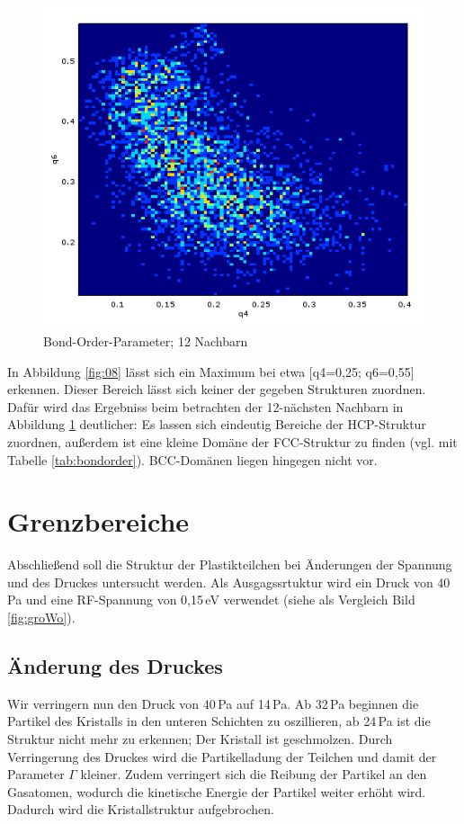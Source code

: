 \begin{figure}[ht]
    \centering
    \includegraphics[scale=0.75]{data/rotationinvarianz12.PNG}
    \caption{Bond-Order-Parameter; 12 Nachbarn}
    \label{fig:12}
\end{figure}

In Abbildung \ref{fig:08} lässt sich ein Maximum bei etwa [q4=0,25; q6=0,55] erkennen. Dieser Bereich lässt sich keiner der gegeben Strukturen zuordnen. Dafür wird das Ergebniss beim betrachten der 12-nächsten Nachbarn in Abbildung \ref{fig:12} deutlicher: Es lassen sich eindeutig Bereiche der HCP-Struktur zuordnen, außerdem ist eine kleine Domäne der FCC-Struktur zu finden (vgl. mit Tabelle \ref{tab:bondorder}). BCC-Domänen liegen hingegen nicht vor.

\section{Grenzbereiche}
Abschließend soll die Struktur der Plastikteilchen bei Änderungen der Spannung und des Druckes untersucht werden. Als Ausgagssrtuktur wird ein Druck von 40\,Pa und eine RF-Spannung von 0,15\,eV verwendet (siehe als Vergleich Bild \ref{fig:groWo}).

\subsection{Änderung des Druckes}
Wir verringern nun den Druck von 40\,Pa auf 14\,Pa. Ab 32\,Pa beginnen die Partikel des Kristalls in den unteren Schichten zu oszillieren, ab 24\,Pa ist die Struktur nicht mehr zu erkennen; Der Kristall ist \glqq geschmolzen\grqq{}. Durch Verringerung des Druckes wird die Partikelladung der Teilchen und damit der Parameter $\Gamma$ kleiner. Zudem verringert sich die Reibung der Partikel an den Gasatomen, wodurch die kinetische Energie der Partikel weiter erhöht wird. Dadurch wird die Kristallstruktur aufgebrochen.


